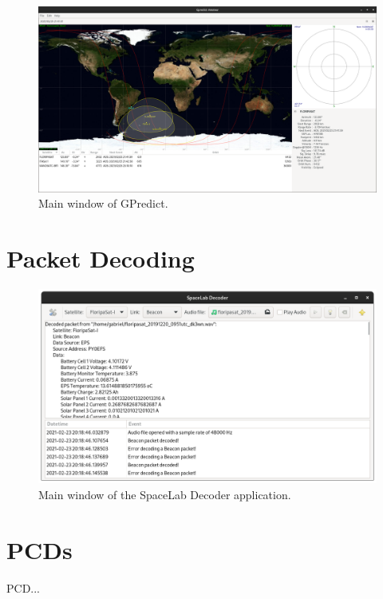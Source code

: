\begin{figure}[!ht]
    \begin{center}
        \includegraphics[width=\textwidth]{figures/gpredict.png}
        \caption{Main window of GPredict.}
        \label{fig:gpredict}
    \end{center}
\end{figure}

\section{Packet Decoding}

\cite{spacelab-decoder}

\begin{figure}[!ht]
    \begin{center}
        \includegraphics[width=\textwidth]{figures/spacelab-decoder.png}
        \caption{Main window of the SpaceLab Decoder application.}
        \label{fig:spacelab-decoder}
    \end{center}
\end{figure}

\section{PCDs}

PCD...
